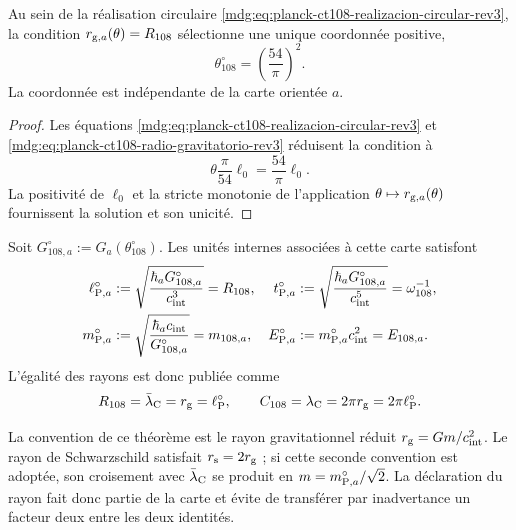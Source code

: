 \begin{proposition}
\label{mdg:prop:selector-circular-planck-ct108-rev3}
Au sein de la réalisation circulaire
\eqref{mdg:eq:planck-ct108-realizacion-circular-rev3}, la condition
\(r_{{\rm g},a}(\theta)=R_{108}\) sélectionne une unique coordonnée
positive,
\begin{equation}
 \boxed{\theta_{108}^{\circ}=\left(\frac{54}{\pi}\right)^2.}
 \label{mdg:eq:theta-circular-planck-ct108-rev3}
\end{equation}
La coordonnée est indépendante de la carte orientée \(a\).
\end{proposition}

\begin{proof}
Les équations
\eqref{mdg:eq:planck-ct108-realizacion-circular-rev3} et
\eqref{mdg:eq:planck-ct108-radio-gravitatorio-rev3} réduisent la condition à
\[
 \theta\frac{\pi}{54}\ell_0=\frac{54}{\pi}\ell_0.
\]
La positivité de \(\ell_0\) et la stricte monotonie de l’application
\(\theta\mapsto r_{{\rm g},a}(\theta)\) fournissent la solution et son
unicité.
\end{proof}

Soit \(G_{108,a}^{\circ}:=G_a(\theta_{108}^{\circ})\). Les unités internes
associées à cette carte satisfont
\begin{align}
 \ell_{{\rm P},a}^{\circ}
 &:=\sqrt{\frac{\hbar_a G_{108,a}^{\circ}}{c_{\rm int}^{3}}}
 =R_{108},
 &
 t_{{\rm P},a}^{\circ}
 &:=\sqrt{\frac{\hbar_a G_{108,a}^{\circ}}{c_{\rm int}^{5}}}
 =\omega_{108}^{-1},
 \label{mdg:eq:planck-ct108-longitud-tiempo-rev3}\\
 m_{{\rm P},a}^{\circ}
 &:=\sqrt{\frac{\hbar_a c_{\rm int}}{G_{108,a}^{\circ}}}
 =m_{108,a},
 &
 E_{{\rm P},a}^{\circ}
 &:=m_{{\rm P},a}^{\circ}c_{\rm int}^{2}=E_{108,a}.
 \label{mdg:eq:planck-ct108-masa-energia-rev3}
\end{align}
L’égalité des rayons est donc publiée comme
\begin{equation}
 R_{108}=\bar\lambda_{\rm C}=r_{\rm g}=\ell_{\rm P}^{\circ},
 \qquad
 C_{108}=\lambda_{\rm C}=2\pi r_{\rm g}=2\pi\ell_{\rm P}^{\circ}.
 \label{mdg:eq:planck-ct108-tres-lectores-rev3}
\end{equation}

La convention de ce théorème est le rayon gravitationnel réduit
\(r_{\rm g}=Gm/c_{\rm int}^{2}\). Le rayon de Schwarzschild satisfait
\(r_{\rm s}=2r_{\rm g}\) ; si cette seconde convention est adoptée, son croisement avec
\(\bar\lambda_{\rm C}\) se produit en
\(m=m_{{\rm P},a}^{\circ}/\sqrt2\). La déclaration du rayon fait donc
partie de la carte et évite de transférer par inadvertance un facteur deux
entre les deux identités.

